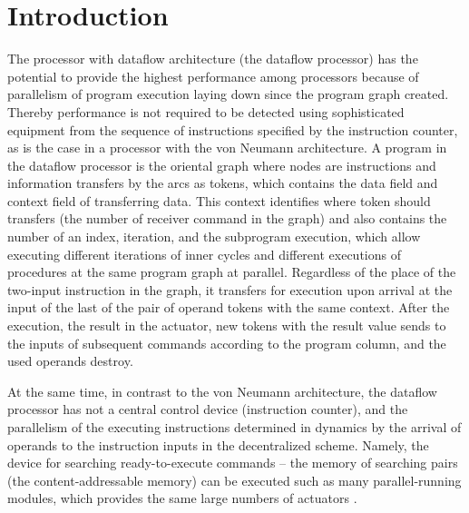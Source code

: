 \documentclass[
11pt,%
tightenlines,%
twoside,%
onecolumn,%
nofloats,%
nobibnotes,%
nofootinbib,%
superscriptaddress,%
noshowpacs,%
centertags]%
{revtex4}
\begin{document}


\maketitle

\section{Introduction}

The processor with dataflow architecture (the dataflow processor) has the potential to provide the highest performance among processors because of parallelism of program execution laying down since the program graph created.
Thereby performance is not required to be detected using sophisticated equipment from the sequence of instructions specified by the instruction counter, as is the case in a processor with the von Neumann architecture.
A program in the dataflow processor is the oriental graph where nodes are instructions and information transfers by the arcs as tokens, which contains the data field and context field of transferring data.
This context identifies where token should transfers (the number of receiver command in the graph) and also contains the number of an index, iteration, and the subprogram execution, which allow executing different iterations of inner cycles and different executions of procedures at the same program graph at parallel.
Regardless of the place of the two-input instruction in the graph, it transfers for execution upon arrival at the input of the last of the pair of operand tokens with the same context.
After the execution, the result in the actuator, new tokens with the result value sends to the inputs of subsequent commands according to the program column, and the used operands destroy.

At the same time, in contrast to the von Neumann architecture, the dataflow processor has not a central control device (instruction counter), and the parallelism of the executing instructions determined in dynamics by the arrival of operands to the instruction inputs in the decentralized scheme.
Namely, the device for searching ready-to-execute commands -- the memory of searching pairs (the content-addressable memory) can be executed such as many parallel-running modules, which provides the same large numbers of actuators \cite{fine-grained-prl}.
\end{document}
